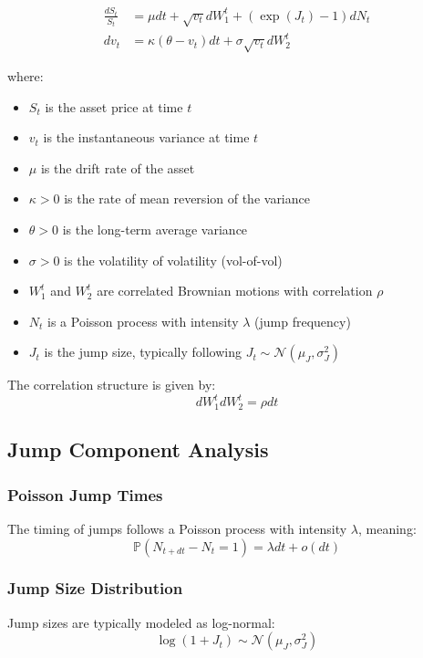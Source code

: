 \documentclass[12pt,a4paper]{article}
\begin{document}
\begin{align}
\frac{dS_t}{S_t} &= \mu dt + \sqrt{v_t} dW_1^t + (\exp(J_t) - 1) dN_t \label{eq:bates_asset}\\
dv_t &= \kappa(\theta - v_t)dt + \sigma\sqrt{v_t} dW_2^t \label{eq:bates_variance}
\end{align}

where:
\begin{itemize}
    \item $S_t$ is the asset price at time $t$
    \item $v_t$ is the instantaneous variance at time $t$
    \item $\mu$ is the drift rate of the asset
    \item $\kappa > 0$ is the rate of mean reversion of the variance
    \item $\theta > 0$ is the long-term average variance
    \item $\sigma > 0$ is the volatility of volatility (vol-of-vol)
    \item $W_1^t$ and $W_2^t$ are correlated Brownian motions with correlation $\rho$
    \item $N_t$ is a Poisson process with intensity $\lambda$ (jump frequency)
    \item $J_t$ is the jump size, typically following $J_t \sim \mathcal{N}(\mu_J, \sigma_J^2)$
\end{itemize}

The correlation structure is given by:
\begin{equation}
dW_1^t dW_2^t = \rho dt
\end{equation}

\subsection{Jump Component Analysis}

\subsubsection{Poisson Jump Times}
The timing of jumps follows a Poisson process with intensity $\lambda$, meaning:
\begin{equation}
\mathbb{P}(N_{t+dt} - N_t = 1) = \lambda dt + o(dt)
\end{equation}

\subsubsection{Jump Size Distribution}
Jump sizes are typically modeled as log-normal:
\begin{equation}
\log(1 + J_t) \sim \mathcal{N}(\mu_J, \sigma_J^2)
\end{equation}
\end{document}
